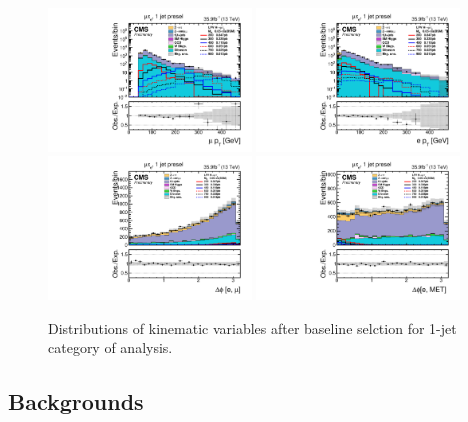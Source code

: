 \begin{figure}[htbp]
     \centering
     \includegraphics[width=0.48\textwidth]{plots_and_figures/chapter5/preselection_HM/log_mutaue_1jet_presel_mPt.pdf}
     \includegraphics[width=0.48\textwidth]{plots_and_figures/chapter5/preselection_HM/log_mutaue_1jet_presel_ePt.pdf}\\
     \includegraphics[width=0.48\textwidth]{plots_and_figures/chapter5/preselection_HM/mutaue_1jet_presel_dphiemu.pdf}
     \includegraphics[width=0.48\textwidth]{plots_and_figures/chapter5/preselection_HM/mutaue_1jet_presel_dphiEMet.pdf}\\
     \caption{Distributions of kinematic variables after baseline selction for 1-jet category of \Hmue analysis.}
     \label{fig:Hmutaue_presel2}
\end{figure}


\subsection{Backgrounds}
\label{hh_evt_sel_bkg}









%
% 
% 

